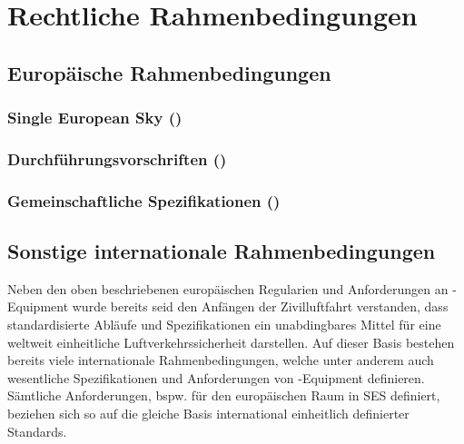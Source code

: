 \chapter{Rechtliche Rahmenbedingungen}

        
    \section{Europäische Rahmenbedingungen}
        \subsection{Single European Sky ()}
            
            
        \subsection{Durchführungsvorschriften ()}
            
                \pagebreak
        
        \subsection{Gemeinschaftliche Spezifikationen ()}
            
                \pagebreak

    \section{Sonstige internationale Rahmenbedingungen}

Neben den oben beschriebenen europäischen Regularien und Anforderungen an \atmans-Equipment wurde bereits seid den Anfängen der Zivilluftfahrt verstanden, dass standardisierte Abläufe und Spezifikationen ein unabdingbares Mittel für eine weltweit einheitliche Luftverkehrssicherheit darstellen.
\cite[156]{eu_icao_milde}
Auf dieser Basis bestehen bereits viele internationale Rahmenbedingungen, welche unter anderem auch wesentliche Spezifikationen und Anforderungen von \atmans-Equipment definieren.
Sämtliche Anforderungen, bspw. für den europäischen Raum in \ac{SES} definiert, beziehen sich so auf die gleiche Basis international einheitlich definierter Standards.

